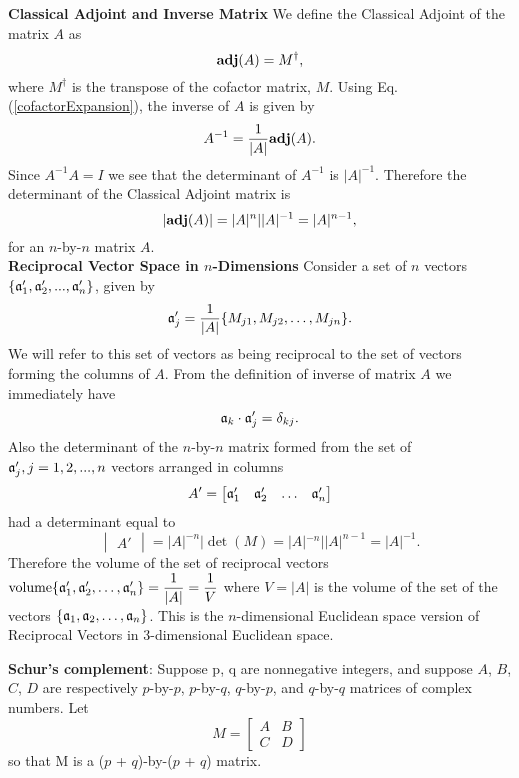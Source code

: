{\bf Classical Adjoint and Inverse Matrix}
We define the Classical Adjoint of the matrix $A$ as
\[ {\bf adj}(A)= M^\dagger, \] where $M^\dagger$ is the transpose of the cofactor matrix, $M$.
Using Eq.(\ref{cofactorExpansion}), the inverse of $A$ is given by
\[ A^{-1} = {1\over|A|}{\bf adj}(A).\label{inverseMatrix}\] Since $A^{-1} A = I$ we see that the determinant of $A^{-1}$ is $|A|^{-1}$. 
Therefore the determinant of the Classical Adjoint matrix is \[ |{\bf adj}(A)| = |A|^n | |A|^{-1} = |A|^{n-1},\] for an $n$-by-$n$ matrix $A$. \\

{\bf Reciprocal Vector Space in $n$-Dimensions}
Consider a set of $n$ vectors $\{ \mathfrak{a}'_1, \mathfrak{a}'_2, ...,\mathfrak{a}'_n\}$, given by
\[ \mathfrak{a}'_j = {1\over|A|}\{M_{j1},M_{j2},\hdots,M_{jn}\}.\] We will refer to this set of vectors as being reciprocal to the set of vectors forming the columns of $A$. 
From the definition of inverse of matrix $A$ we immediately have
\[ \mathfrak{a}_k \cdot \mathfrak{a}'_j = \delta_{kj}.\] 
Also the determinant of the $n$-by-$n$ matrix formed from the set of $\mathfrak{a}'_j, j=1,2,...,n$ vectors arranged in columns
\begin{equation}
A' = 
\begin{bmatrix}
\mathfrak{a}'_{1} & \mathfrak{a}'_{2}  & \hdots & \mathfrak{a}'_{n}  \\
\end{bmatrix}
\end{equation}had a determinant equal to 
\begin{equation}
\begin{vmatrix} 
A'
\end{vmatrix} = |A|^{-n}| \det(M) =  |A|^{-n}| |A|^{n-1} = |A|^{-1}.
\end{equation}Therefore the volume of the set of reciprocal vectors ${\rm volume}\{\mathfrak{a}'_1, \mathfrak{a}'_2, \hdots, \mathfrak{a}'_n\} = \displaystyle{{1\over|A|} = {1\over V}}$ where $V =|A|$ is the volume of the set of the vectors
$\{\mathfrak{a}_1, \mathfrak{a}_2, \hdots, \mathfrak{a}_n\}$. This is the $n$-dimensional Euclidean space version of Reciprocal Vectors in 3-dimensional Euclidean space.   

{\bf Schur's complement}:
Suppose p, q are nonnegative integers, and suppose $A$, $B$, $C$, $D$ are respectively $p$-by-$p$, $p$-by-$q$, $q$-by-$p$, and $q$-by-$q$ matrices of complex numbers. Let
\begin{equation}
{\displaystyle M=\left[{\begin{matrix}A&B\\C&D\end{matrix}}\right]}
\end{equation} so that M is a ($p$ + $q$)-by-($p$ + $q$) matrix.\\

